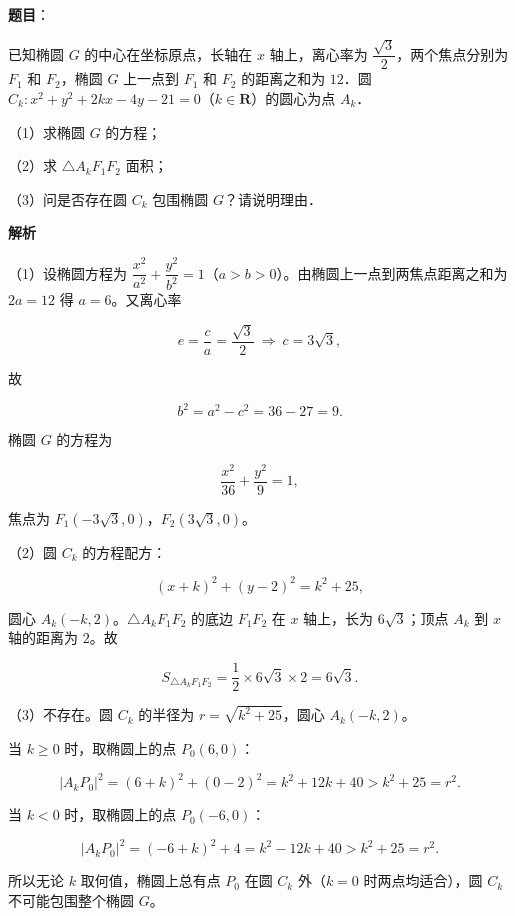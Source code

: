 \begin{answer}

\textbf{题目}：

已知椭圆 $G$ 的中心在坐标原点，长轴在 $x$ 轴上，离心率为 $\dfrac{\sqrt3}{2}$，两个焦点分别为 $F_1$ 和 $F_2$，椭圆 $G$ 上一点到 $F_1$ 和 $F_2$ 的距离之和为 $12$．圆 $C_k:x^2+y^2+2kx-4y-21=0$（$k\in\mathbf R$）的圆心为点 $A_k$．

（1）求椭圆 $G$ 的方程；

（2）求 $\triangle A_kF_1F_2$ 面积；

（3）问是否存在圆 $C_k$ 包围椭圆 $G$？请说明理由．

\textbf{解析}

（1）设椭圆方程为 $\dfrac{x^2}{a^2}+\dfrac{y^2}{b^2}=1$（$a>b>0$）。由椭圆上一点到两焦点距离之和为 $2a=12$ 得 $a=6$。又离心率

\nopagebreak[4]
\[e=\frac ca=\frac{\sqrt3}{2}\ \Longrightarrow\ c=3\sqrt3,\]

故

\nopagebreak[4]
\[b^2=a^2-c^2=36-27=9.\]

椭圆 $G$ 的方程为

\nopagebreak[4]
\[\frac{x^2}{36}+\frac{y^2}{9}=1,\]

焦点为 $F_1(-3\sqrt3,0)$，$F_2(3\sqrt3,0)$。

（2）圆 $C_k$ 的方程配方：

\nopagebreak[4]
\[(x+k)^2+(y-2)^2=k^2+25,\]

圆心 $A_k(-k,2)$。$\triangle A_kF_1F_2$ 的底边 $F_1F_2$ 在 $x$ 轴上，长为 $6\sqrt3$；顶点 $A_k$ 到 $x$ 轴的距离为 $2$。故

\nopagebreak[4]
\[S_{\triangle A_kF_1F_2}=\frac12\times6\sqrt3\times2=6\sqrt3.\]

（3）不存在。圆 $C_k$ 的半径为 $r=\sqrt{k^2+25}$，圆心 $A_k(-k,2)$。

当 $k\geqslant0$ 时，取椭圆上的点 $P_0(6,0)$：

\nopagebreak[4]
\[|A_kP_0|^2=(6+k)^2+(0-2)^2=k^2+12k+40>k^2+25=r^2.\]

当 $k<0$ 时，取椭圆上的点 $P_0(-6,0)$：

\nopagebreak[4]
\[|A_kP_0|^2=(-6+k)^2+4=k^2-12k+40>k^2+25=r^2.\]

所以无论 $k$ 取何值，椭圆上总有点 $P_0$ 在圆 $C_k$ 外（$k=0$ 时两点均适合），圆 $C_k$ 不可能包围整个椭圆 $G$。


\end{answer}
